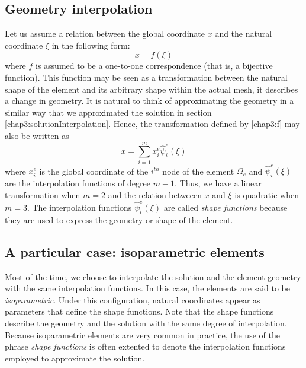 	\subsection{Geometry interpolation}
Let us assume a relation between the global coordinate $ x $ and the natural coordinate $ \xi $ in the following form:
\begin{equation}
\label{chap3:f}
x = f(\xi)
\end{equation}
where $ f $ is assumed to be a one-to-one correspondence (that is, a bijective function). This function may be seen as a transformation between the natural shape of the element and its arbitrary shape within the actual mesh, it describes a change in geometry. It is natural to think of approximating the geometry in a similar way that we approximated the solution in section \ref{chap3:solutionInterpolation}. Hence, the transformation defined by \eqref{chap3:f} may also be written as
\begin{equation}
x = \sum_{i=1}^m x_i^e \hat{\psi}_i^e(\xi)
\end{equation}
where $ x_i^e $ is the global coordinate of the $ i^{th} $ node of the element $ \Omega_e $ and $ \hat{\psi}_i^e(\xi) $ are the interpolation functions of degree $ m-1 $. Thus, we have a linear transformation when $ m = 2 $ and the relation betweeen $ x $ and $ \xi $ is quadratic when $ m=3 $. The interpolation functions $ \hat{\psi}_i^e(\xi) $ are called \emph{shape functions} because they are used to express the geometry or shape of the element. 


	\subsection{A particular case: isoparametric elements}
Most of the time, we choose to interpolate the solution and the element geometry with the same interpolation functions. In this case, the elements are said to be \emph{isoparametric}. Under this configuration, natural coordinates appear as parameters that define the shape functions. Note that the shape functions describe the geometry and the solution with the same degree of interpolation. Because isoparametric elements are very common in practice, the use of the phrase \emph{shape functions} is often extented to denote the interpolation functions employed to approximate the solution.
	
